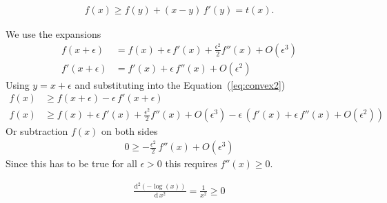 \documentclass{sotonExamBoxes}    %
\newcommand{\dd}{\mathrm{d}}
\newcommand{\bra}[1]{\left(#1\right)}
\begin{document}
\begin{question}{10}
\begin{qparts}
\begin{answer}
\begin{align*}
          f(x) \geq f(y) + (x-y)\,f'(y) = t(x).
        \end{align*}
      \end{answer}
      \clearpage
      \begin{answer}
      \end{answer}
      \begin{answer}
        We use the expansions
        \begin{align*}
          f(x+\epsilon) &= f(x) + \epsilon\,f'(x) +
                          \frac{\epsilon^2}{2} f''(x) + O(\epsilon^3) \\
          f'(x+\epsilon) &= f'(x) + \epsilon\,f''(x) +
                           O(\epsilon^2) 
        \end{align*}
        Using $y=x+\epsilon$ and substituting into the Equation~(\ref{eq:convex2})
        \begin{align*}
          f(x) &\geq f(x+\epsilon)  - \epsilon \, f'(x+\epsilon) \\
          f(x) &\geq f(x) + \epsilon\,f'(x) +
          \frac{\epsilon^2}{2} f''(x) + O(\epsilon^3)
          - \epsilon\,\bra{f'(x) + \epsilon\,f''(x) +
                           O(\epsilon^2) }
        \end{align*}
        Or subtraction $f(x)$ on both sides
        \begin{align*}
          0 \geq - \frac{\epsilon^2}{2} \, f''(x) + O(\epsilon^3)
        \end{align*}
        Since this has to be true for all $\epsilon>0$ this requires $f''(x)\geq0$.
      \end{answer}
      \begin{answer}
        \begin{align*}
          \frac{\dd^2 (-\log(x))}{\dd \, x^2} = \frac{1}{x^2} \geq 0
        \end{align*}
      \end{answer}
  \end{qparts}
\end{question}
\clearpage
\end{document}
